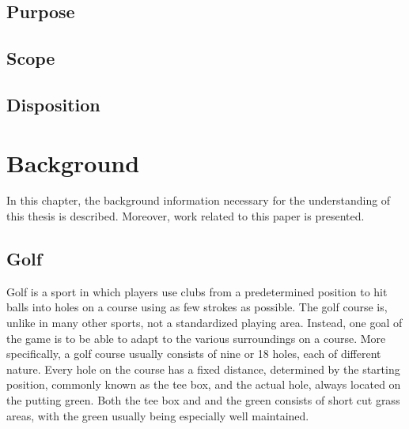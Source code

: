 \documentclass{kththesis}
\begin{document}
\section{Purpose}

\section{Scope}

\section{Disposition}

\chapter{Background}
\label{chapter:background}
In this chapter, the background information necessary for the understanding of this thesis is described. Moreover, work related to this paper is presented.

\section{Golf}
\label{sec:golf}
Golf is a sport in which players use clubs from a predetermined position to hit balls into holes on a course using as few strokes as possible. The golf course is, unlike in many other sports, not a standardized playing area. Instead, one goal of the game is to be able to adapt to the various surroundings on a course. More specifically, a golf course usually consists of nine or 18 holes, each of different nature. Every hole on the course has a fixed distance, determined by the starting position, commonly known as the tee box, and the actual hole, always located on the putting green. Both the tee box and and the green consists of short cut grass areas, with the green usually being especially well maintained.
\end{document}
